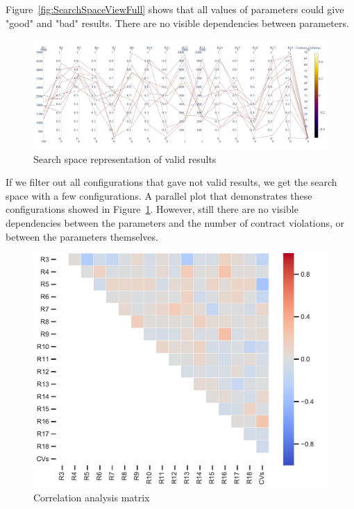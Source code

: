 Figure~\ref{fig:SearchSpaceViewFull} shows that all values of parameters could give "good" and "bad" results. There are no visible dependencies between parameters. 

\begin{figure}
	\centering
	\includegraphics[width=\textwidth]{images/SPEA2_Zero_validity.html.pdf}
	\caption[Search space representation of valid results]{Search space representation of valid results}
	\label{fig:SearchSpaceValid}
\end{figure}

If we filter out all configurations that gave not valid results, we get the search space with a few configurations. A parallel plot that demonstrates these configurations showed in Figure~\ref{fig:SearchSpaceValid}. However, still there are no visible dependencies between the parameters and the number of contract violations, or between the parameters themselves.

\begin{figure}
	\centering
	\includegraphics[width=\textwidth]{images/CorrelationAnalysis.pdf}
	\caption[Correlation analysis matrix]{Correlation analysis matrix}
	\label{fig:CorrelationAnalysis}
\end{figure}

